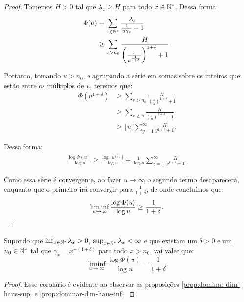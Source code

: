 \begin{proof}
  Tomemos $H > 0$ tal que $\lambda_x \geq H$ para todo $x \in {\mathbb{N^*}}$. Dessa
  forma:
  \begin{align*}
    \Phi(u) &= \sum_{x \in {\mathbb{N^*}}} \frac{\lambda_x}{\frac{1}{u\gamma_x} +
      1}\\
    &\geq \sum_{x > n_0}
    \frac{H}{\left(\frac{x}{u^{\frac{1}{1+\delta}}}\right)^{1+\delta} +1}.
  \end{align*}

  Portanto, tomando $u > n_0$, e agrupando a série em somas sobre os inteiros
  que estão entre os múltiplos de $u$, teremos que:
  \begin{align*}
    \Phi(u^{1+\delta}) 
    &\geq \sum_{x > n_0}
    \frac{H}{\left(\frac{x}{u}\right)^{1+\delta} +1}\\
    &\geq \sum_{x \geq u}
    \frac{H}{\left(\frac{x}{u}\right)^{1+\delta} +1}\\
    &\geq \lfloor u \rfloor \sum_{y = 1}^{\infty}
    \frac{H}{y^{1+\delta} + 1}.
  \end{align*}

  Dessa forma:
  \begin{align*}
    \frac{\log \Phi(u)}{\log u} \geq \frac{\log\lfloor
      u^{\frac{1}{1+\delta}} \rfloor }{\log u} + 
    \frac{1}{\log u} \sum_{y = 1}^{\infty}
    \frac{H}{y^{1+\delta} + 1}.
  \end{align*}

  Como essa série é convergente, ao fazer $u \to \infty$ o segundo
  termo desaparecerá, enquanto que o primeiro irá convergir para
  $\frac{1}{1+\delta}$, de onde concluímos que:
  \begin{displaymath}
    \liminf_{u \to \infty} \frac{\log \Phi (u)}{\log u} \geq
    \frac{1}{1+\delta} .
    \qedhere
  \end{displaymath}
\end{proof}

\begin{corolario}
  \label{cor:igualar-dim-haus}
  Supondo que $\inf_{x \in {\mathbb{N^*}}} \lambda_x > 0$, $\sup_{x \in {\mathbb{N^*}}}
  \lambda_x < \infty$ e que existam um $\delta > 0$ e um $n_0 \in {\mathbb{N^*}}$
  tal que $\gamma_x = x^{-(1+\delta)}$ para todo $x > n_0$, vai valer que:
  \begin{displaymath}
    \liminf_{u \to \infty} \frac{\log \Phi(u)}{\log u} =
    \frac{1}{1+\delta} .
  \end{displaymath}
\end{corolario}
\begin{proof}
  Esse corolário é evidente ao observar as proposições
  \ref{prop:dominar-dim-haus-sup} e \ref{prop:dominar-dim-haus-inf}.
\end{proof}

